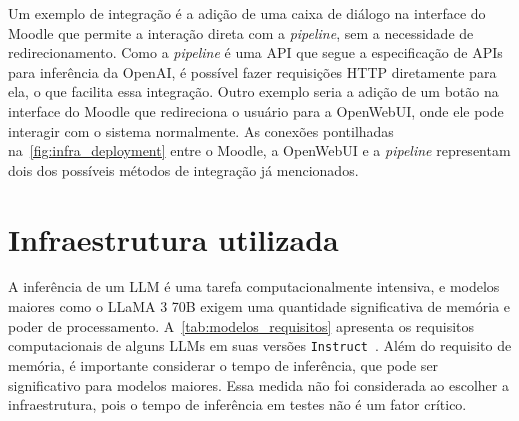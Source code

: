 \documentclass[journal]{IEEEtran}
\begin{document}
Um exemplo de integração é a adição de uma caixa de diálogo na interface do Moodle que permite a interação direta com a \textit{pipeline}, sem a necessidade de redirecionamento.
Como a \textit{pipeline} é uma API que segue a especificação de APIs para inferência da OpenAI, é possível fazer requisições HTTP diretamente para ela, o que facilita essa integração.
Outro exemplo seria a adição de um botão na interface do Moodle que redireciona o usuário para a OpenWebUI, onde ele pode interagir com o sistema normalmente.
As conexões pontilhadas na~\cref{fig:infra_deployment} entre o Moodle, a OpenWebUI e a \textit{pipeline} representam dois dos possíveis métodos de integração já mencionados.

\section{Infraestrutura utilizada\label{sec:infra_nossa}}

\noindent%
A inferência de um LLM é uma tarefa computacionalmente intensiva, e modelos maiores como o LLaMA 3 70B exigem uma quantidade significativa de memória e poder de processamento.
A~\cref{tab:modelos_requisitos} apresenta os requisitos computacionais de alguns LLMs em suas versões \texttt{Instruct}~\cite{ollama}.
Além do requisito de memória, é importante considerar o tempo de inferência, que pode ser significativo para modelos maiores.
Essa medida não foi considerada ao escolher a infraestrutura, pois o tempo de inferência em testes não é um fator crítico.
\end{document}
